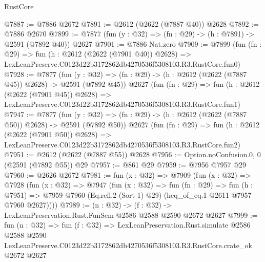 \begin{lexlean}{RustCore}
\begin{coremodule}
@7887 := @7886 @2672
@7891 := @2612 (@2622 (@7887 @40)) @2628
@7892 := @7886 @2670
@7899 := @7877 (fun (y : @32) => (fn : @29) -> (h : @7891) -> @2591 (@7892 @40)) @2627
@7901 := @7886 Nat.zero
@7909 := @7899
    (fun (fn : @29) =>
    fun (h : @2612 (@2622 (@7901 @40)) @2628) =>
    LexLeanPreserve.C0123d22b3172862db4270536f5308103.R3.RustCore.fun0)
@7928 := @7877
    (fun (y : @32) => (fn : @29) -> (h : @2612 (@2622 (@7887 @45)) @2628) -> @2591 (@7892 @45))
    @2627
    (fun (fn : @29) =>
    fun (h : @2612 (@2622 (@7901 @45)) @2628) =>
    LexLeanPreserve.C0123d22b3172862db4270536f5308103.R3.RustCore.fun1)
@7947 := @7877
    (fun (y : @32) => (fn : @29) -> (h : @2612 (@2622 (@7887 @50)) @2628) -> @2591 (@7892 @50))
    @2627
    (fun (fn : @29) =>
    fun (h : @2612 (@2622 (@7901 @50)) @2628) =>
    LexLeanPreserve.C0123d22b3172862db4270536f5308103.R3.RustCore.fun2)
@7951 := @2612 (@2622 (@7887 @55)) @2628
@7956 := Option.noConfusion.{0, 0} (@2591 (@7892 @55)) @29
@7957 := @861 @29
@7959 := @7956 @7957 @29
@7960 := @2626 @2672
@7981 := fun (x : @32) =>
  @7909
    (fun (x : @32) =>
    @7928
      (fun (x : @32) =>
      @7947
        (fun (x : @32) =>
        fun (fn : @29) =>
        fun (h : @7951) =>
        @7959 @7960 (Eq.refl.{2} (Sort 1) @29) (heq_of_eq.{1} @2611 @7957 @7960 @2627))))
@7989 := (n : @32) -> (f : @32) -> LexLeanPreservation.Rust.FunSem @2586 @2588 @2590 @2672 @2627
@7999 := fun (n : @32) =>
  fun (f : @32) =>
  LexLeanPreservation.Rust.simulate
    @2586
    @2588
    @2590
    LexLeanPreserve.C0123d22b3172862db4270536f5308103.R3.RustCore.crate_ok
    @2672
    @2627
\end{coremodule}
\end{lexlean}
